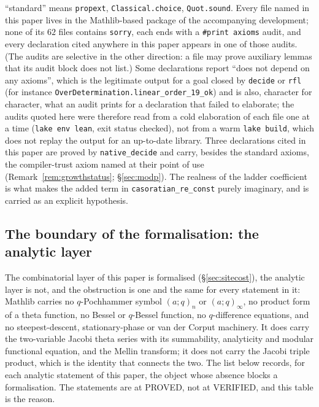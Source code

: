 \documentclass[11pt]{article}
\theoremstyle{plain}
\theoremstyle{definition}
\theoremstyle{remark}
\begin{document}
\noindent ``standard'' means \texttt{propext}, \texttt{Classical.choice}, \texttt{Quot.sound}. Every
file named in this paper lives in the Mathlib-based package of the accompanying development; none of
its $62$ files contains \texttt{sorry}, each ends with a \verb|#print axioms| audit, and every
declaration cited anywhere in this paper appears in one of those audits. (The audits are selective
in the other direction: a file may prove auxiliary lemmas that its audit block does not list.) Some
declarations report ``does not depend on any axioms'', which is the legitimate output
for a goal closed by \texttt{decide} or \texttt{rfl} (for instance
\texttt{OverDetermination.linear\_order\_19\_ok}) and is also, character for character, what an
audit prints for a declaration that failed to elaborate; the audits quoted here were therefore read
from a cold elaboration of each file one at a time (\texttt{lake env lean}, exit status checked),
not from a warm \texttt{lake build}, which does not replay the output for an up-to-date library.
Three declarations cited in this paper are proved by \texttt{native\_decide} and carry, besides the
standard axioms, the compiler-trust axiom named at their point of use
(Remark~\ref{rem:growthstatus}; \S\ref{sec:modp}). The realness of the ladder coefficient is what
makes the added term in \texttt{casoratian\_re\_const} purely imaginary, and is carried as an
explicit hypothesis.

\subsection*{The boundary of the formalisation: the analytic layer}\label{sec:leanboundary}

The combinatorial layer of this paper is formalised (\S\ref{sec:sitecost}), the analytic layer is
not, and the obstruction is one and the same for every statement in it: Mathlib carries no
$q$-Pochhammer symbol $(a;q)_n$ or $(a;q)_\infty$, no product form of a theta function, no Bessel
or $q$-Bessel function, no $q$-difference equations, and no steepest-descent, stationary-phase or
van der Corput machinery. It does carry the two-variable Jacobi theta series with its summability,
analyticity and modular functional equation, and the Mellin transform; it does not carry the
Jacobi triple product, which is the identity that connects the two. The list below records, for
each analytic statement of this paper, the object whose absence blocks a formalisation. The
statements are at PROVED, not at VERIFIED, and this table is the reason.
\end{document}
